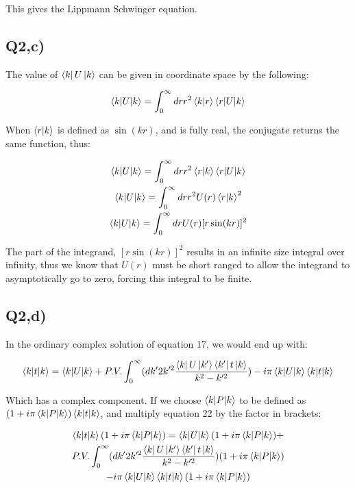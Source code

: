 \documentclass{article}
\begin{document}
			This gives the Lippmann Schwinger equation.
			
		\subsection{Q2,c)}
		
			The value of $\bra{k}U\ket{k}$ can be given in coordinate space by the following:
			
			\begin{gather}
				\braket{k|U|k} = \int_{0}^{\infty}drr^2\braket{k|r}\braket{r|U|k}
			\end{gather}
			
			When $\braket{r|k}$ is defined as $\sin(kr)$, and is fully real, the conjugate returns the same function, thus:
			
			\begin{gather}
				\braket{k|U|k} = \int_{0}^{\infty}drr^2\braket{r|k}\braket{r|U|k}\\
				\braket{k|U|k} = \int_{0}^{\infty}drr^2 U(r) \braket{r|k}^2\\
				\braket{k|U|k} = \int_{0}^{\infty} dr U(r)  [r\sin(kr)]^2
			\end{gather}
			
			The part of the integrand, $[r\sin(kr)]^2$  results in an infinite size integral over infinity, thus we know that $U(r)$ must be short ranged to allow the integrand to asymptotically go to zero, forcing this integral to be finite. 
		
		\subsection{Q2,d)}
		
			In the ordinary complex solution of equation 17, we would end up with:
			
			\begin{gather}
				\braket{k|t|k} = \braket{k|U|k} + P.V. \int_{0}^{\infty}(dk'2k'^2\frac{\bra{k}U\ket{k'}\bra{k'}t\ket{k}}{k^2-k'^2}) - i \pi  \braket{k|U|k}\braket{k|t|k}\\
			\end{gather}
			
			Which has a complex component. If we choose $\braket{k|P|k}$ to be defined as $(1 + i\pi\braket{k|P|k})\braket{k|t|k}$, and multiply equation 22 by the factor in brackets:
			
			\begin{gather}
				\braket{k|t|k}(1 + i\pi\braket{k|P|k}) = \braket{k|U|k}(1 + i\pi\braket{k|P|k}) + \\
				P.V. \int_{0}^{\infty}(dk'2k'^2\frac{\bra{k}U\ket{k'}\bra{k'}t\ket{k}}{k^2-k'^2})(1 + i\pi\braket{k|P|k}) \\
				- i \pi \braket{k|U|k}\braket{k|t|k}(1 + i\pi\braket{k|P|k})\\
			\end{gather}
			
\end{document}
